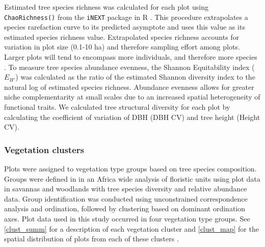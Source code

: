 \documentclass[11pt,a4paper]{article}
\begin{document}
Estimated tree species richness was calculated for each plot using \verb|ChaoRichness()| from the \verb|iNEXT| package in R \citep{Hsieh2016}. This procedure extrapolates a species rarefaction curve to its predicted asymptote and uses this value as its estimated species richness value. Extrapolated species richness accounts for variation in plot size (0.1-10 ha) and therefore sampling effort among plots. Larger plots will tend to encompass more individuals, and therefore more species \citep{Dengler2009}. To measure tree species abundance evenness, the Shannon Equitability index ($E_{H'}$) \citep{Smith1996} was calculated as the ratio of the estimated Shannon diversity index to the natural log of estimated species richness. Abundance evenness allows for greater niche complementarity at small scales due to an increased spatial heterogeneity of functional traits. We calculated tree structural diversity for each plot by calculating the coefficient of variation of DBH (DBH CV) and tree height (Height CV). 

% 

\subsubsection{Vegetation clusters}

Plots were assigned to vegetation type groups based on tree species composition. Groups were defined in \citet{Fayolle2018} in an Africa wide analysis of floristic units using plot data in savannas and woodlands with tree species diversity and relative abundance data. Group identification was conducted using unconstrained correspondence analysis and ordination, followed by clustering based on dominant ordination axes. Plot data used in this study occurred in four vegetation type groups. See \autoref{clust_summ} for a description of each vegetation cluster and \autoref{clust_map} for the spatial distribution of plots from each of these clusters .
\end{document}
